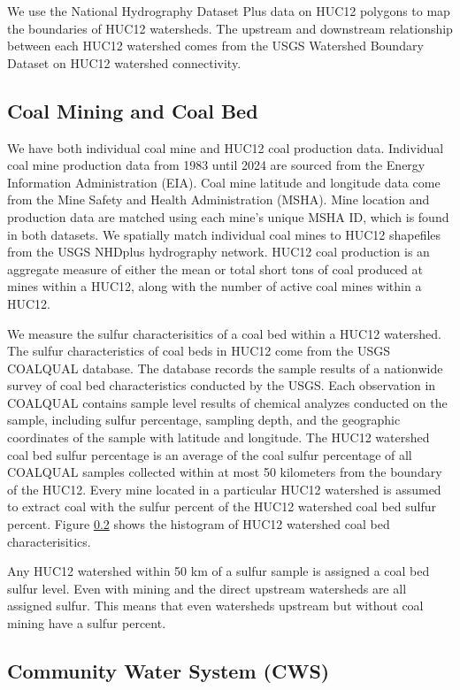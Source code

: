 \documentclass{article}
\begin{document}
We use the National Hydrography Dataset Plus data on HUC12 polygons to map the boundaries of HUC12 watersheds. The upstream and downstream relationship between each HUC12 watershed comes from the USGS Watershed Boundary Dataset on HUC12 watershed connectivity.

\subsection{Coal Mining and Coal Bed}

We have both individual coal mine and HUC12 coal production data. Individual coal mine production data from 1983 until 2024 are sourced from the Energy Information Administration (EIA). Coal mine latitude and longitude data come from the Mine Safety and Health Administration (MSHA). Mine location and production data are matched using each mine's unique MSHA ID, which is found in both datasets. We spatially match individual coal mines to HUC12 shapefiles from the USGS NHDplus hydrography network. HUC12 coal production is an aggregate measure of either the mean or total short tons of coal produced at mines within a HUC12, along with the number of active coal mines within a HUC12.

We measure the sulfur characterisitics of a coal bed within a HUC12 watershed. The sulfur characteristics of coal beds in HUC12 come from the USGS COALQUAL database. The database records the sample results of a nationwide survey of coal bed characteristics conducted by the USGS. Each observation in COALQUAL contains sample level results of chemical analyzes conducted on the sample, including sulfur percentage, sampling depth, and the geographic coordinates of the sample with latitude and longitude. The HUC12 watershed coal bed sulfur percentage is an average of the coal sulfur percentage of all COALQUAL samples collected within at most 50 kilometers from the boundary of the HUC12. Every mine located in a particular HUC12 watershed is assumed to extract coal with the sulfur percent of the HUC12 watershed coal bed sulfur percent. Figure \ref{} shows the histogram of HUC12 watershed coal bed characterisitics. 

Any HUC12 watershed within 50 km of a sulfur sample is assigned a coal bed sulfur level. Even with mining and the direct upstream watersheds are all assigned sulfur. This means that even watersheds upstream but without coal mining have a sulfur percent. 

\subsection{Community Water System (CWS)}
\end{document}
